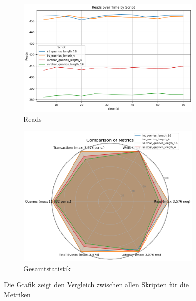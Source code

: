 \vspace{-5pt}
\begin{figure}[H]
    \centering
    \begin{subfigure}[t]{0.48\textwidth}
        \centering
        \includegraphics[width=\textwidth]{PNGs/Script/Join_Typ/join-type/Reads}
        \caption{Reads}
        \label{join-typ-reads}
    \end{subfigure}
    \hfill
    \begin{subfigure}[t]{0.48\textwidth}
        \centering
        \includegraphics[width=\textwidth]{PNGs/Script/Join_Typ/join-type/statistics}
        \caption{Gesamtstatistik}
        \label{fig:join-typ-hex}
    \end{subfigure}
    \caption[Join-Typ: Metrikvergleich]{Die Grafik zeigt den Vergleich zwischen allen Skripten für die Metriken}
    \label{fig:join-typ-comp-metric}
\end{figure}
\vspace{-20pt}

